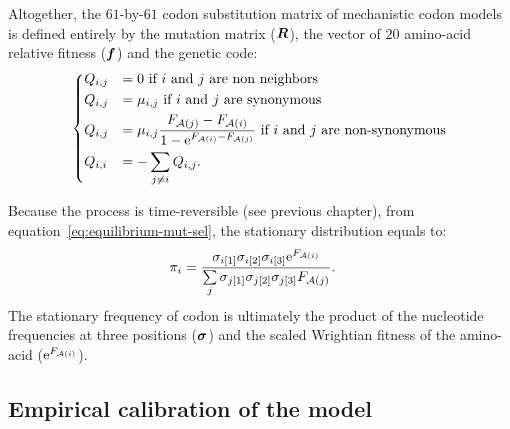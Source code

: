 Altogether, the $61$-by-$61$ \gls{codon} \gls{substitution} matrix of mechanistic \gls{codon} models is defined entirely by the mutation matrix ($\bm{R}$), the vector of $20$ amino-acid relative fitness ($\bm{f}$) and the genetic code:
\begin{equation}
    \begin{dcases}
        Q_{{i}, {j}} & = 0 \text{ if ${i}$ and ${j}$ are non neighbors} \\
        Q_{{i}, {j}} & = \mu_{{i}, {j}} \text{ if ${i}$ and ${j}$ are synonymous} \\
        Q_{{i}, {j}} & = \mu_{{i}, {j}} \dfrac{F_{\mathcal{A}({j})} - F_{\mathcal{A}({i})}}{1 - \mathrm{e}^{F_{\mathcal{A}({i})} - F_{\mathcal{A}({j})}} } \text{ if ${i}$ and ${j}$ are non-synonymous} \\
        Q_{{i}, {i}} & = - \sum\limits_{{j} \neq {i}} Q_{{i}, {j}}.
    \end{dcases}
    \label{eq:propensities-models}
\end{equation}

Because the process is time-reversible (see previous chapter), from equation~\ref{eq:equilibrium-mut-sel}, the stationary distribution equals to:
\begin{align}
    \pi_{{i}} & = \dfrac{\sigma_{{i}[1]}\sigma_{{i}[2]}\sigma_{{i}[3]}\mathrm{e}^{F_{\mathcal{A}({i})}}}{\sum\limits_{{j}}\sigma_{{j}[1]}\sigma_{{j}[2]}\sigma_{{j}[3]}F_{\mathcal{A}({j})} }.
\end{align}
The stationary frequency of codon is ultimately the product of the nucleotide frequencies at three positions ($\bm{\sigma}$) and the scaled Wrightian fitness of the amino-acid ($\mathrm{e}^{F_{\mathcal{A}({i})}}$).

\subsection{Empirical calibration of the model}
\label{subsec:empirical-calibration-HB}

